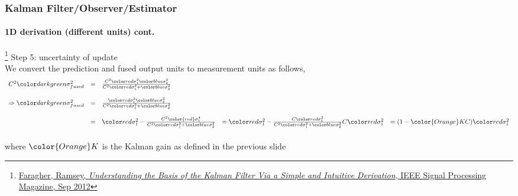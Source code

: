 \documentclass{beamer}
\begin{document}
\begin{frame}
\frametitle{Kalman Filter/Observer/Estimator}
\framesubtitle{1D derivation (different units) \tiny cont.}

\footnote{\tiny\hspace{-0.23in} \href{http://www.cl.cam.ac.uk/~rmf25/papers/Understanding the Basis of the Kalman Filter.pdf}{Faragher, Ramsey, \emph{Understanding the Basis of the Kalman Filter Via a Simple and Intuitive Derivation}, IEEE Signal Processing Magazine, Sep 2012}}
\scriptsize
Step 5: {\color{darkgreen}uncertainty of update}\\
We convert the prediction and fused output units to measurement units as follows,
\begin{equation*}
\begin{array}{rlllllll}
C^2 \varfused&=& \frac{C^2\varone \vartwo}{C^2\varone + \vartwo}\\\\
\Rightarrow \varfused&=& \frac{\varone \vartwo}{C^2\varone + \vartwo}\\\\
&=&\varone - \frac{C^2\color{red}\sigma^4_1}{C^2\varone + \vartwo}
&=\varone-\frac{C\varone}{C^2\varone + \vartwo}C\varone
&=(1-{\color{Orange}K}C)\varone\\\\
\end{array}
\end{equation*}
where ${\color{Orange}K}$ is the Kalman gain as defined in the previous slide
\end{frame}
\end{document}
